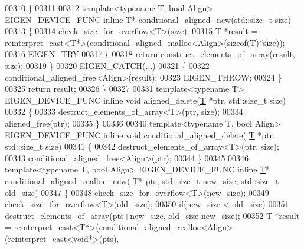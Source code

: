 \begin{DoxyCode}
00310 \}
00311 
00312 \textcolor{keyword}{template}<\textcolor{keyword}{typename} T, \textcolor{keywordtype}{bool} Align> EIGEN\_DEVICE\_FUNC \textcolor{keyword}{inline} \hyperlink{group___sparse_core___module_class_eigen_1_1_triplet}{T}* conditional\_aligned\_new(std::size\_t size)
00313 \{
00314   check\_size\_for\_overflow<T>(size);
00315   \hyperlink{group___sparse_core___module_class_eigen_1_1_triplet}{T} *result = \textcolor{keyword}{reinterpret\_cast<}\hyperlink{group___sparse_core___module_class_eigen_1_1_triplet}{T}*\textcolor{keyword}{>}(conditional\_aligned\_malloc<Align>(\textcolor{keyword}{sizeof}(\hyperlink{group___sparse_core___module_class_eigen_1_1_triplet}{T})*size));
00316   EIGEN\_TRY
00317   \{
00318     \textcolor{keywordflow}{return} construct\_elements\_of\_array(result, size);
00319   \}
00320   EIGEN\_CATCH(...)
00321   \{
00322     conditional\_aligned\_free<Align>(result);
00323     EIGEN\_THROW;
00324   \}
00325   \textcolor{keywordflow}{return} result;
00326 \}
00327 
00331 \textcolor{keyword}{template}<\textcolor{keyword}{typename} T> EIGEN\_DEVICE\_FUNC \textcolor{keyword}{inline} \textcolor{keywordtype}{void} aligned\_delete(\hyperlink{group___sparse_core___module_class_eigen_1_1_triplet}{T} *ptr, std::size\_t size)
00332 \{
00333   destruct\_elements\_of\_array<T>(ptr, size);
00334   aligned\_free(ptr);
00335 \}
00336 
00340 \textcolor{keyword}{template}<\textcolor{keyword}{typename} T, \textcolor{keywordtype}{bool} Align> EIGEN\_DEVICE\_FUNC \textcolor{keyword}{inline} \textcolor{keywordtype}{void} conditional\_aligned\_delete(
      \hyperlink{group___sparse_core___module_class_eigen_1_1_triplet}{T} *ptr, std::size\_t size)
00341 \{
00342   destruct\_elements\_of\_array<T>(ptr, size);
00343   conditional\_aligned\_free<Align>(ptr);
00344 \}
00345 
00346 \textcolor{keyword}{template}<\textcolor{keyword}{typename} T, \textcolor{keywordtype}{bool} Align> EIGEN\_DEVICE\_FUNC \textcolor{keyword}{inline} \hyperlink{group___sparse_core___module_class_eigen_1_1_triplet}{T}* conditional\_aligned\_realloc\_new(
      \hyperlink{group___sparse_core___module_class_eigen_1_1_triplet}{T}* pts, std::size\_t new\_size, std::size\_t old\_size)
00347 \{
00348   check\_size\_for\_overflow<T>(new\_size);
00349   check\_size\_for\_overflow<T>(old\_size);
00350   \textcolor{keywordflow}{if}(new\_size < old\_size)
00351     destruct\_elements\_of\_array(pts+new\_size, old\_size-new\_size);
00352   \hyperlink{group___sparse_core___module_class_eigen_1_1_triplet}{T} *result = \textcolor{keyword}{reinterpret\_cast<}\hyperlink{group___sparse_core___module_class_eigen_1_1_triplet}{T}*\textcolor{keyword}{>}(conditional\_aligned\_realloc<Align>(\textcolor{keyword}{reinterpret\_cast<}\textcolor{keywordtype}{void}*\textcolor{keyword}{>}(pts), \textcolor{keyword}{
}
\end{DoxyCode}
